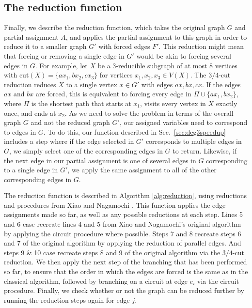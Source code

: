 \subsection{The reduction function}
\label{sec:reduction}

Finally, we describe the reduction function, which takes the original graph $G$ and partial assignment $A$, and applies the partial assignment to this graph in order to reduce it to a smaller graph $G'$ with forced edges $F'$. This reduction might mean that forcing or removing a single edge in $G'$ would be akin to forcing several edges in $G$. For example, let $X$ be a $3$-reducible subgraph of at most $8$ vertices with $\text{cut}(X) = \{ax_1, bx_2, cx_3\}$ for vertices $x_1, x_2, x_3 \in V(X)$. The $3/4$-cut reduction reduces $X$ to a single vertex $x \in G'$ with edges $ax, bx, cx$. If the edges $ax$ and $bx$ are forced, this is equivalent to forcing every edge in $\Pi \cup \{ax_1, bx_2\}$, where $\Pi$ is the shortest path that starts at $x_1$, visits every vertex in $X$ exactly once, and ends at $x_2$. As we need to solve the problem in terms of the overall graph $G$ and not the reduced graph $G'$, our assigned variables need to correspond to edges in $G$. To do this, our \FnHeuristicthree function described in Sec.\ \ref{sec:deg3speedup} includes a step where if the edge selected in $G'$ corresponds to multiple edges in $G$, we simply select one of the corresponding edges in $G$ to return. Likewise, if the next edge in our partial assignment is one of several edges in $G$ corresponding to a single edge in $G'$, we apply the same assignment to all of the other corresponding edges in $G$.

The reduction function is described in Algorithm \ref{alg:reduction}, using reductions and procedures from Xiao and Nagamochi \cite{xiao2016degree3}. This function applies the edge assignments made so far, as well as any possible reductions at each step. Lines 5 and 6 case recreate lines 4 and 5 from Xiao and Nagamochi's original algorithm by applying the circuit procedure where possible. Steps 7 and 8 recreate steps 6 and 7 of the original algorithm by applying the reduction of parallel edges. And steps 9 \& 10 case recreate steps 8 and 9 of the original algorithm via the $3/4$-cut reduction. We then apply the next step of the branching that has been performed so far, to ensure that the order in which the edges are forced is the same as in the classical algorithm, followed by branching on a circuit at edge $e_i$ via the circuit procedure. Finally, we check whether or not the graph can be reduced further by running the reduction steps again for edge $j$.

